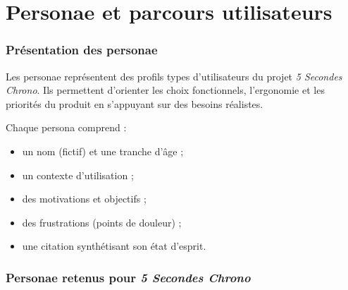 \chapter{Personae et parcours utilisateurs}\label{annexe:persona}



\subsection{Présentation des personae}

Les personae représentent des profils types d’utilisateurs du projet \emph{5 Secondes Chrono}.
Ils permettent d’orienter les choix fonctionnels, l’ergonomie et les priorités du produit
en s’appuyant sur des besoins réalistes.

Chaque persona comprend :
\begin{itemize}
    \item un nom (fictif) et une tranche d’âge ;
    \item un contexte d’utilisation ;
    \item des motivations et objectifs ;
    \item des frustrations (points de douleur) ;
    \item une citation synthétisant son état d’esprit.
\end{itemize}

\subsection{Personae retenus pour \emph{5 Secondes Chrono}}

